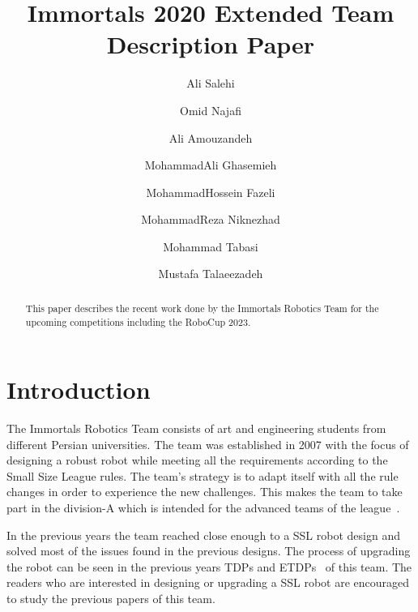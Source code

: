 \documentclass[runningheads]{llncs}
\begin{document}
%
\title{Immortals 2020 Extended Team Description Paper}
%
%
\author{
Ali Salehi \and
Omid Najafi \and
Ali Amouzandeh \and
MohammadAli Ghasemieh \and
MohammadHossein Fazeli \and
MohammadReza Niknezhad \and
Mohammad Tabasi \and
Mustafa Talaeezadeh
}
%
%
%
\maketitle              %
%
\begin{abstract}
This paper describes the recent work done by the Immortals Robotics Team for the upcoming competitions including the RoboCup 2023.

\end{abstract}
%
%
%
\section{Introduction}
The Immortals Robotics Team consists of art and engineering students from different Persian universities.
The team was established in 2007 with the focus of designing a robust robot while meeting all the requirements according to the Small Size League rules. The team's strategy is to adapt itself with all the rule changes in order to experience the new challenges. This makes the team to take part in the division-A which is intended for the advanced teams of the league~\cite{ref_website}.

In the previous years the team reached close enough to a SSL robot design and solved most of the issues found in the previous designs. The process of upgrading the robot can be seen in the previous years TDPs and ETDPs~\cite{ref_ETDP2019} of this team. The readers who are interested in designing or upgrading a SSL robot are encouraged to study the previous papers of this team.
\end{document}
